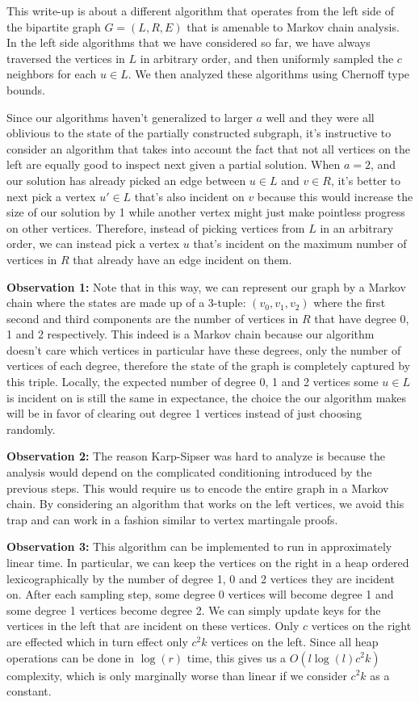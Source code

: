 \documentclass[]{letter}
\begin{document}
This write-up is about a different algorithm that operates from the left side of the bipartite graph $G=(L,R,E)$ that is amenable to Markov chain analysis. In the left side algorithms that we have considered so far, we have always traversed the vertices in $L$ in arbitrary order, and then uniformly sampled the $c$ neighbors for each $u\in L$. We then analyzed these algorithms using Chernoff type bounds.

Since our algorithms haven't generalized to larger $a$ well and they were all oblivious to the state of the partially constructed subgraph, it's instructive to consider an algorithm that takes into account the fact that not all vertices on the left are equally  good to inspect next given a partial solution. When $a=2$, and our solution has already picked an edge between $u\in L$ and $v\in R$, it's better to next pick a vertex $u'\in L$ that's also incident on $v$ because this would increase the size of our solution by 1 while another vertex might just make pointless progress on other vertices. Therefore, instead of picking vertices from $L$ in an arbitrary order, we can instead pick a vertex $u$ that's incident on the maximum number of vertices in $R$ that already have an edge incident on them. 

\textbf{Observation 1:} Note that in this way, we can represent our graph by a Markov chain where the states are made up of a 3-tuple: $(v_0,v_1,v_2)$ where the first second and third components are the number of vertices in $R$ that have degree 0, 1 and 2 respectively. This indeed is a Markov chain because our algorithm doesn't care which vertices in particular have these degrees, only the number of vertices of each degree, therefore the state of the graph is completely captured by this triple. Locally, the expected number of degree 0, 1 and 2 vertices some $u\in L$ is incident on is still the same in expectance, the choice the our algorithm makes will be in favor of clearing out degree 1 vertices instead of just choosing randomly.

\textbf{Observation 2:} The reason Karp-Sipser was hard to analyze is because the analysis would depend on the complicated conditioning introduced by the previous steps. This would require us to encode the entire graph in a Markov chain. By considering an algorithm that works on the left vertices, we avoid this trap and can work in a fashion similar to vertex martingale proofs.

\textbf{Observation 3:} This algorithm can be implemented to run in approximately linear time. In particular, we can keep the vertices on the right in a heap ordered lexicographically by the number of degree 1, 0 and 2 vertices they are incident on. After each sampling step, some degree 0 vertices will become degree 1 and some degree 1 vertices become degree 2. We can simply update keys for the vertices in the left that are incident on these vertices. Only $c$ vertices on the right are effected which in turn effect only $c^2k$ vertices on the left. Since all heap operations can be done in $\log(r)$ time, this gives us a $O(l \log(l) c^2k)$ complexity, which is only marginally worse than linear if we consider $c^2 k$ as a constant. 
\end{document}
